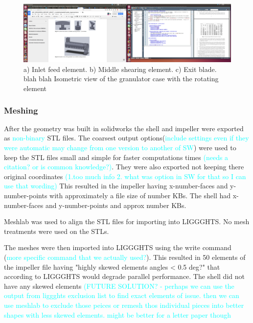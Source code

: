 \documentclass[preprint,11pt,authoryear]{elsarticle}
\begin{document}
	      \begin{figure}[H]
	      \centering
	      \includegraphics[scale=0.1]{mthds_dem_charles_fig5pt3and4_blades_n_isometric}
	      \caption{a) Inlet feed element. b) Middle shearing element.  c) Exit blade. blah blah Isometric view of the granulator case with the rotating element }
	      \label{fig:mthds_dem_charles_fig5pt3and4_blades_n_isometric}
	      \end{figure}     
	    
	
	    
	
	    \subsubsection{Meshing}
	    \par After the geometry was built in solidworks the shell and impeller were exported as \textcolor{cyan}{non-binary} STL files. The coarsest output options(\textcolor{cyan}{include settings even if they were automatic may change from one version to another of SW}) were used to keep the STL files small and simple for faster computations times \textcolor{cyan}{(needs a citation? or is common knowledge?)}. They were also exported not keeping there original coordinates \textcolor{cyan}{(1.too much info 2. what was option in SW for that so I can use that wording)} This resulted in the impeller having x-number-faces and y-number-points with approximately a file size of number KBs. The shell had x-number-faces and y-number-points and approx number KBs.  
	    \par Meshlab was used to align the STL files for importing into LIGGGHTS. No mesh treatments were used on the STLs. 
	    \par The meshes were then imported into LIGGGHTS using the write command (\textcolor{cyan}{more specific command that we actually used?}). This resulted in 50 elements of the impeller file having "highly skewed elements angles < 0.5 deg?" that according to LIGGGHTS would degrade parallel performance. The shell did not have any skewed elements \textcolor{cyan}{(FUTURE SOLUTION? - perhaps we can use the output from liggghts exclusion list to find exact elements of issue. then we can use meshlab to exclude those peices or remesh thos individual pieces into better shapes with less skewed elements. might be better for a letter paper though}
	    
\end{document}
